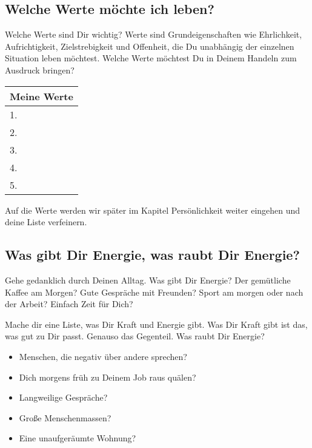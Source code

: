 \documentclass[../Lebensziel.tex]{subfiles}
\begin{document}
\subsection*{Welche Werte möchte ich leben?}
Welche Werte sind Dir wichtig?
Werte sind Grundeigenschaften wie Ehrlichkeit, Aufrichtigkeit, Zielstrebigkeit und Offenheit, die Du unabhängig der einzelnen Situation leben möchtest.
Welche Werte möchtest Du in Deinem Handeln zum Ausdruck bringen?

\begin{table}[h!]
    \centering
    \setlength{\tabcolsep}{18pt}
    \renewcommand{\arraystretch}{2}
    \begin{tabular}{p{12cm}}
        \textbf{Meine Werte} \\\hline
        1.                   \\\hline
        2.                   \\\hline
        3.                   \\\hline
        4.                   \\\hline
        5.
    \end{tabular}
    \label{werte-leben}
\end{table}

Auf die Werte werden wir später im Kapitel Persönlichkeit weiter eingehen und deine Liste verfeinern.

\subsection*{Was gibt Dir Energie, was raubt Dir Energie?}
Gehe gedanklich durch Deinen Alltag. Was gibt Dir Energie?
Der gemütliche Kaffee am Morgen? Gute Gespräche mit Freunden? Sport am morgen oder nach der Arbeit? Einfach Zeit für Dich?

Mache dir eine Liste, was Dir Kraft und Energie gibt. Was Dir Kraft gibt ist das, was gut zu Dir passt.
Genauso das Gegenteil. Was raubt Dir Energie?
\begin{itemize}
    \item Menschen, die negativ über andere sprechen?
    \item Dich morgens früh zu Deinem Job raus quälen?
    \item Langweilige Gespräche?
    \item Große Menschenmassen?
    \item Eine unaufgeräumte Wohnung?
\end{itemize}
\end{document}
